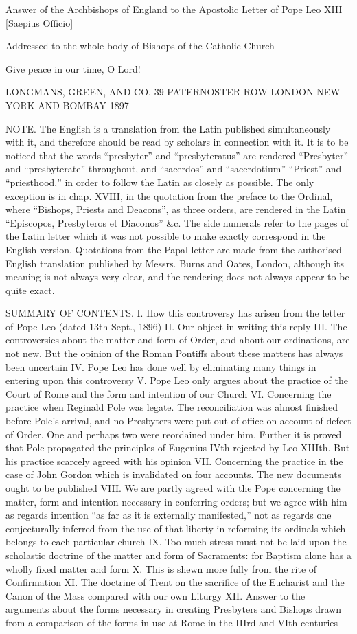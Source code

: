 Answer of the Archbishops of England to the Apostolic Letter of Pope Leo XIII [Saepius Officio]

Addressed to the whole body of Bishops of the Catholic Church

Give peace in our time, O Lord!

LONGMANS, GREEN, AND CO. 39 PATERNOSTER ROW LONDON NEW YORK AND BOMBAY 1897

NOTE. The English is a translation from the Latin published simultaneously with it, and therefore should be read by scholars in connection with it. It is to be noticed that the words “presbyter” and “presbyteratus” are rendered “Presbyter” and “presbyterate” throughout, and “sacerdos” and “sacerdotium” “Priest” and “priesthood,” in order to follow the Latin as closely as possible. The only exception is in chap. XVIII, in the quotation from the preface to the Ordinal, where “Bishops, Priests and Deacons”, as three orders, are rendered in the Latin “Episcopos, Presbyteros et Diaconos” \&c. The side numerals refer to the pages of the Latin letter which it was not possible to make exactly correspond in the English version. Quotations from the Papal letter are made from the authorised English translation published by Messrs. Burns and Oates, London, although its meaning is not always very clear, and the rendering does not always appear to be quite exact.

SUMMARY OF CONTENTS. I. How this controversy has arisen from the letter of Pope Leo (dated 13th Sept., 1896) II. Our object in writing this reply III. The controversies about the matter and form of Order, and about our ordinations, are not new. But the opinion of the Roman Pontiffs about these matters has always been uncertain IV. Pope Leo has done well by eliminating many things in entering upon this controversy V. Pope Leo only argues about the practice of the Court of Rome and the form and intention of our Church VI. Concerning the practice when Reginald Pole was legate. The reconciliation was almost finished before Pole’s arrival, and no Presbyters were put out of office on account of defect of Order. One and perhaps two were reordained under him. Further it is proved that Pole propagated the principles of Eugenius IVth rejected by Leo XIIIth. But his practice scarcely agreed with his opinion VII. Concerning the practice in the case of John Gordon which is invalidated on four accounts. The new documents ought to be published VIII. We are partly agreed with the Pope concerning the matter, form and intention necessary in conferring orders; but we agree with him as regards intention “as far as it is externally manifested,” not as regards one conjecturally inferred from the use of that liberty in reforming its ordinals which belongs to each particular church IX. Too much stress must not be laid upon the scholastic doctrine of the matter and form of Sacraments: for Baptism alone has a wholly fixed matter and form X. This is shewn more fully from the rite of Confirmation XI. The doctrine of Trent on the sacrifice of the Eucharist and the Canon of the Mass compared with our own Liturgy XII. Answer to the arguments about the forms necessary in creating Presbyters and Bishops drawn from a comparison of the forms in use at Rome in the IIIrd and VIth centuries

